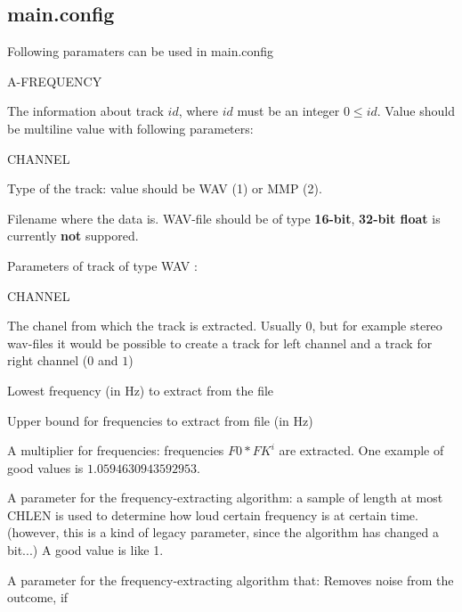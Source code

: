 \documentclass{article}
\begin{document}
      
    \subsection{main.config}
      Following paramaters can be used in main.config
      \begin{labeling}{A-FREQUENCY}
        \item [TRACK\#id] The information about track $id$, where $id$ must be an integer $0\le id$. Value should be 
                          multiline value with following parameters:
                          \begin{labeling}{CHANNEL}
                            \item [TYPE]  Type of the track: value should be WAV (1) or MMP (2).
                            \item [FILE]  Filename where the data is. WAV-file should be of type \textbf{16-bit}, \textbf{32-bit float} is 
                                          currently \textbf{not} suppored.
                          \end{labeling}
                          Parameters of track of type WAV :
                          \begin{labeling}{CHANNEL}
                            \item [CHANNEL] The chanel from which the track is extracted. Usually $0$, but for example stereo wav-files it would
                                            be possible to create a track for left channel and a track for right channel ($0$ and $1$)
                            \item [F0]      Lowest frequency (in Hz) to extract from the file
                            \item [F1]      Upper bound for frequencies to extract from file (in Hz)
                            \item [FK]      A multiplier for frequencies: frequencies $F0*FK^i$ are extracted. One example of good values is
                                            $1.0594630943592953$.
                            \item [CHLEN]   A parameter for the frequency-extracting algorithm: a sample of length at most CHLEN is used to 
                                            determine how loud certain frequency is at certain time. (however, this is a kind of legacy 
                                            parameter, since the algorithm has changed a bit...) A good value is like 1.
                            \item [THR]     A parameter for the frequency-extracting algorithm that: Removes noise from the outcome, if 

\end{labeling}
\end{labeling}
\end{document}
